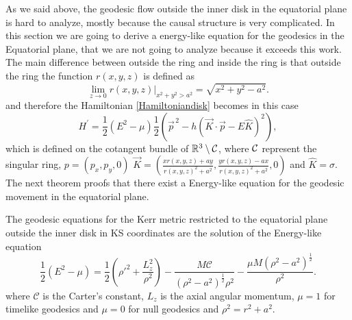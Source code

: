 As we said above, the geodesic flow outside the inner disk in the equatorial plane is hard to analyze, mostly because the causal structure is very complicated. In this section we are going to derive a energy-like equation for the geodesics in the Equatorial plane, that we are not going to analyze because it exceeds this work. The main difference between outside the ring and inside the ring is that outside the ring the function $r(x,y,z)$ is defined as
\begin{equation}\label{rinplane}
 \lim_{z \to 0} r(x,y,z)|_{x^2+y^2>a^2}= \sqrt{x^2+y^2-a^2}.
\end{equation}
and therefore the Hamiltonian \cref{Hamiltoniandisk} becomes in this case
\begin{equation}\label{Hamiltonplanoeq}
H^{\prime}= \frac{1}{2}\left(E^2-\mu \right)
\frac{1}{2} \left( \vec{p}^{\,2}- h \left( \vec{K} \cdot \vec{p} - E 
\hat{K} \right)^2 \right),
\end{equation} which is defined on the cotangent bundle of $\mathbb{R}^{3} \setminus {\mathcal C}$, where ${\mathcal C}$ represent the singular ring, $p=\left(p_x,p_y,0\right)$ $\vec{K}=\left(\frac{x r(x,y,z)+a y}{r(x,y,z)^2+a^2},\frac{y r(x,y,z)-a x}{r(x,y,z)^2+a^2},0\right)$ and $\hat{K}=\sigma$. The next theorem proofs that there exist a Energy-like equation for the geodesic movement in the equatorial plane.
\begin{theorem}
 The geodesic equations for the Kerr metric restricted to the equatorial plane outside the inner disk in \gls{KS} coordinates are the solution of the Energy-like equation
 \begin{equation}
 \frac{1}{2} \left( E^2-\mu \right) = \frac{1}{2} \left( \rho'^2 +\frac{L_z^2}{\rho^2}\right)-\frac{ M \mathcal{C}}{(\rho^2-a^2)^\frac{1}{2} \rho^2}-\frac{ \mu  M (\rho^2-a^2)^\frac{1}{2}}{\rho^2}.
 \end{equation}
where $\mathcal{C}$ is the Carter's constant, $L_z$ is the axial angular momentum, $\mu=1$ for timelike geodesics and $\mu=0$ for null geodesics and $\rho^2=r^2+a^2$.
\end{theorem}
